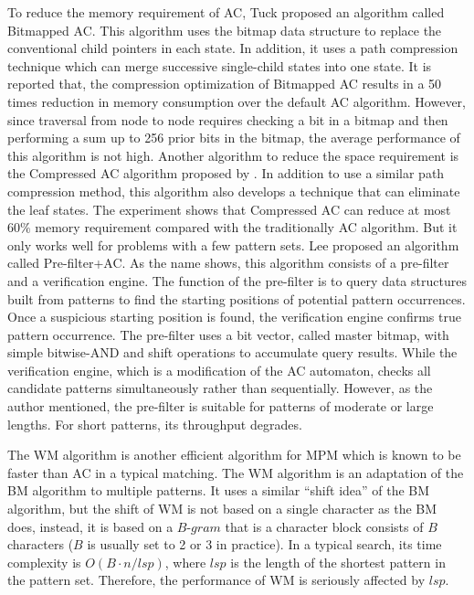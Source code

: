 To reduce the memory requirement of \textsf{AC}, Tuck \cite{Tuck2004}
proposed an algorithm called \textsf{Bitmapped AC}. This algorithm
uses the bitmap data structure to replace the conventional child
pointers in each state. In addition, it uses a path compression
technique which can merge successive single-child states into one
state. It is reported that, the compression optimization of
\textsf{Bitmapped AC} results in a 50 times reduction in memory
consumption over the default \textsf{AC} algorithm. However, since
traversal from node to node requires checking a bit in a bitmap and
then performing a sum up to 256 prior bits in the bitmap, the average
performance of this algorithm is not high.  Another algorithm to
reduce the space requirement is the \textsf{Compressed AC} algorithm
proposed by \cite{Bremeler2011}. In addition to use a similar path
compression method, this algorithm also develops a technique that can
eliminate the leaf states. The experiment shows that
\textsf{Compressed AC} can reduce at most $60\%$ memory requirement
compared with the traditionally \textsf{AC} algorithm. But it only
works well for problems with a few pattern sets. Lee \cite{Lee2013}
proposed an algorithm called \textsf{Pre-filter+AC}. As the name
shows, this algorithm consists of a pre-filter and a verification
engine. The function of the pre-filter is to query data structures
built from patterns to find the starting positions of potential
pattern occurrences. Once a suspicious starting position is found, the
verification engine confirms true pattern occurrence. The pre-filter
uses a bit vector, called master bitmap, with simple bitwise-AND and
shift operations to accumulate query results. While the verification
engine, which is a modification of the AC automaton, checks all
candidate patterns simultaneously rather than sequentially. However,
as the author mentioned, the pre-filter is suitable for patterns of
moderate or large lengths. For short patterns, its throughput
degrades.

The \textsf{WM} algorithm is another efficient algorithm for MPM which
is known to be faster than \textsf{AC} in a typical matching. The
\textsf{WM} algorithm is an adaptation of the \textsf{BM} algorithm to
multiple patterns. It uses a similar ``shift idea'' of the \textsf{BM}
algorithm, but the shift of \textsf{WM} is not based on a single
character as the \textsf{BM} does, instead, it is based on a
$B$-$gram$ that is a character block consists of $B$ characters ($B$
is usually set to 2 or 3 in practice). In a typical search, its time
complexity is $O(B \cdot n/lsp)$, where $lsp$ is the length of the
shortest pattern in the pattern set. Therefore, the performance of WM
is seriously affected by $lsp$.

